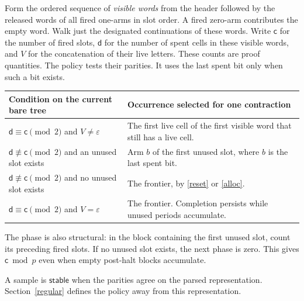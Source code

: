 \documentclass[11pt,letterpaper,oneside,reqno]{amsart}
\newcommand{\eps}{\varepsilon}
\newcommand{\cmt}{\mathsf c}
\newcommand{\pops}{\mathsf d}
\newcommand{\st}{\mathsf{stable}}
\begin{document}
Form the ordered sequence of \emph{visible words} from the header followed by the released words of all fired one-arms in slot order. A fired zero-arm contributes the empty word. Walk just the designated continuations of these words. Write \(\cmt\) for the number of fired slots, \(\pops\) for the number of spent cells in these visible words, and \(V\) for the concatenation of their live letters. These counts are proof quantities. The policy tests their parities. It uses the last spent bit only when such a bit exists.

\begin{center}
\small
\begin{tabular}{@{}p{.43\linewidth}p{.50\linewidth}@{}}
\toprule
Condition on the current bare tree & Occurrence selected for one contraction\\
\midrule
\(\pops\equiv\cmt\pmod2\) and \(V\ne\eps\)
 & The first live cell of the first visible word that still has a live cell.\\[3pt]
\(\pops\not\equiv\cmt\pmod2\) and an unused slot exists
 & Arm \(b\) of the first unused slot, where \(b\) is the last spent bit.\\[3pt]
\(\pops\not\equiv\cmt\pmod2\) and no unused slot exists
 & The frontier, by \eqref{reset} or \eqref{alloc}.\\[3pt]
\(\pops\equiv\cmt\pmod2\) and \(V=\eps\)
 & The frontier. Completion persists while unused periods accumulate.\\
\bottomrule
\end{tabular}
\end{center}
The phase is also structural: in the block containing the first unused slot, count its preceding fired slots. If no unused slot exists, the next phase is zero. This gives \(\cmt\bmod p\) even when empty post-halt blocks accumulate.

A sample is \(\st\) when the parities agree on the parsed representation. Section~\ref{regular} defines the policy away from this representation.
\end{document}
